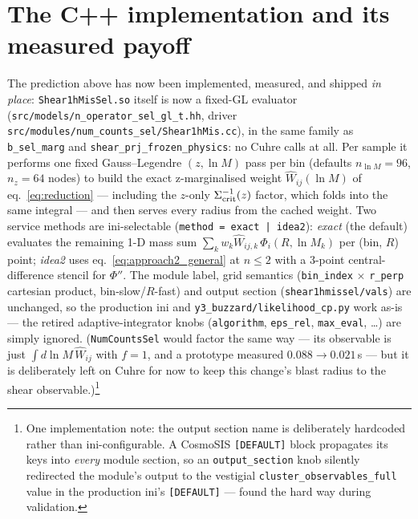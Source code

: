 \documentclass[a4paper, 11pt]{article}
\newcommand{\lnM}{\ln M}
\newcommand{\pyfile}[1]{{\small\texttt{#1}}}
\begin{document}
\section{The C++ implementation and its measured payoff}
\label{sec:cpp_impl}

The prediction above has now been implemented, measured, and shipped
\emph{in place}: \texttt{Shear1hMisSel.so} itself is now a fixed-GL
evaluator (\pyfile{src/models/n\_operator\_sel\_gl\_t.hh}, driver
\pyfile{src/modules/num\_counts\_sel/Shear1hMis.cc}), in the same
family as \texttt{b\_sel\_marg} and
\texttt{shear\_prj\_frozen\_physics}: no Cuhre calls at all. Per
sample it performs one fixed Gauss--Legendre $(z,\lnM)$ pass per bin
(defaults $n_{\lnM}=96$, $n_z=64$ nodes) to build the exact
z-marginalised weight $\widehat W_{ij}(\lnM)$ of
eq.~\eqref{eq:reduction} --- including the $z$-only
$\Sigma_{\rm crit}^{-1}(z)$ factor, which folds into the same integral
--- and then serves every radius from the cached weight. Two service
methods are ini-selectable (\texttt{method = exact | idea2}):
\emph{exact} (the default) evaluates the remaining 1-D mass sum
$\sum_k w_k \widehat W_{ij,k}\,\Phi_i(R,\lnM_k)$ per (bin, $R$) point;
\emph{idea2} uses eq.~\eqref{eq:approach2_general} at $n\le2$ with a
3-point central-difference stencil for $\Phi''$. The module label,
grid semantics (\texttt{bin\_index} $\times$ \texttt{r\_perp}
cartesian product, bin-slow/$R$-fast) and output section
(\texttt{shear1hmissel/vals}) are unchanged, so the production ini and
\pyfile{y3\_buzzard/likelihood\_cp.py} work as-is --- the retired
adaptive-integrator knobs (\texttt{algorithm}, \texttt{eps\_rel},
\texttt{max\_eval}, \dots) are simply ignored.
(\texttt{NumCountsSel} would factor the same way --- its observable is
just $\int d\lnM\,\widehat W_{ij}$ with $f=1$, and a prototype
measured $0.088\to0.021$\,s --- but it is deliberately left on Cuhre
for now to keep this change's blast radius to the shear
observable.)\footnote{One implementation note: the output section name
is deliberately hardcoded rather than ini-configurable. A CosmoSIS
\texttt{[DEFAULT]} block propagates its keys into \emph{every} module
section, so an \texttt{output\_section} knob silently redirected the
module's output to the vestigial \texttt{cluster\_observables\_full}
value in the production ini's \texttt{[DEFAULT]} --- found the hard
way during validation.}
\end{document}
